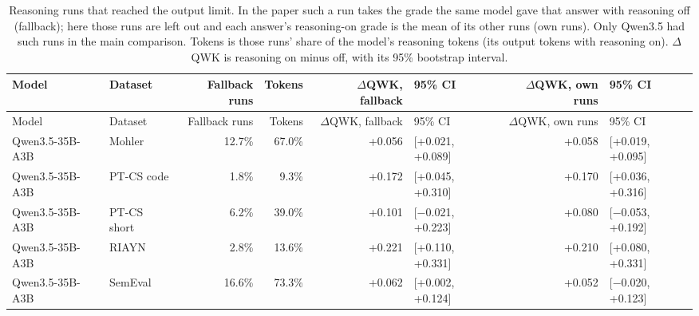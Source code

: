 \documentclass[10pt]{article}
\begin{document}
\begingroup\footnotesize
\begin{longtable}{llrrrlrl}
\caption{Reasoning runs that reached the output limit. In the paper such a run takes the grade the same model gave that answer with reasoning off (fallback); here those runs are left out and each answer's reasoning-on grade is the mean of its other runs (own runs). Only Qwen3.5 had such runs in the main comparison. Tokens is those runs' share of the model's reasoning tokens (its output tokens with reasoning on). $\Delta$QWK is reasoning on minus off, with its 95\% bootstrap interval.}\\
\hline
Model & Dataset & Fallback runs & Tokens & $\Delta$QWK, fallback & 95\% CI & $\Delta$QWK, own runs & 95\% CI \\ \hline
\endfirsthead
\hline
Model & Dataset & Fallback runs & Tokens & $\Delta$QWK, fallback & 95\% CI & $\Delta$QWK, own runs & 95\% CI \\ \hline
\endhead
Qwen3.5-35B-A3B & Mohler & 12.7\% & 67.0\% & +0.056 & [+0.021, +0.089] & +0.058 & [+0.019, +0.095] \\
Qwen3.5-35B-A3B & PT-CS code & 1.8\% & 9.3\% & +0.172 & [+0.045, +0.310] & +0.170 & [+0.036, +0.316] \\
Qwen3.5-35B-A3B & PT-CS short & 6.2\% & 39.0\% & +0.101 & [$-$0.021, +0.223] & +0.080 & [$-$0.053, +0.192] \\
Qwen3.5-35B-A3B & RIAYN & 2.8\% & 13.6\% & +0.221 & [+0.110, +0.331] & +0.210 & [+0.080, +0.331] \\
Qwen3.5-35B-A3B & SemEval & 16.6\% & 73.3\% & +0.062 & [+0.002, +0.124] & +0.052 & [$-$0.020, +0.123] \\
\hline
\end{longtable}
\endgroup
\end{document}

